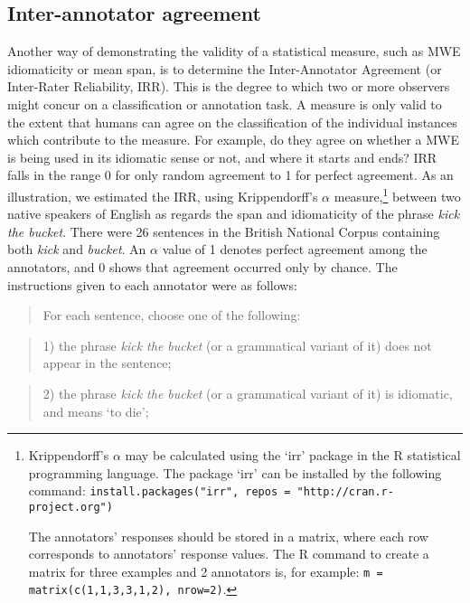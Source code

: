 \documentclass[output=paper]{langsci/langscibook}
\begin{document}
\subsection{Inter-annotator agreement}

Another way of demonstrating the validity of a statistical measure, such
as MWE idiomaticity or mean span, is to determine the  Inter-Annotator
Agreement (or Inter-Rater Reliability, IRR). This is the degree to
which two or more observers might concur on a classification or
annotation task. A measure is only valid to the extent that humans can
agree on the classification of the individual instances which
contribute to the measure. For example, do they agree on whether a MWE
is being used in its idiomatic sense or not, and where it starts and
ends? IRR falls in the range 0 for only random agreement to 1 for
perfect agreement. As an illustration, we estimated the IRR, using
Krippendorff’s $\alpha$ measure,\footnote{Krippendorff’s $\alpha$ may be
calculated using the ‘irr’ package in the R statistical programming
language. The package ‘irr’ can be installed by the following
command: \texttt{install.packages("irr", repos = "http://cran.r-project.org")}

The annotators’
responses should be stored in a matrix, where each row corresponds to
annotators' response values. The R command to create a matrix for three
examples and 2 annotators is, for example: \texttt{m = matrix(c(1,1,3,3,1,2), nrow=2)}.
}
between two native speakers of English
as regards the span and idiomaticity of the phrase \textit{kick the bucket}.
There were 26 sentences in the British National Corpus containing both
\textit{kick} and \textit{bucket}. An $\alpha$ value of 1 denotes perfect agreement
among the annotators, and 0 shows that agreement occurred only by
chance. The instructions given to each annotator were as follows:


\begin{quotation}
For each sentence, choose one of the following:
\end{quotation}

\begin{quotation}
1) the phrase \textit{kick the bucket} (or a grammatical variant of it) does
not appear in the sentence;
\end{quotation}

\begin{quotation}
2) the phrase \textit{kick the bucket} (or a grammatical variant of it) is
idiomatic, and means `to die';
\end{quotation}
\end{document}
